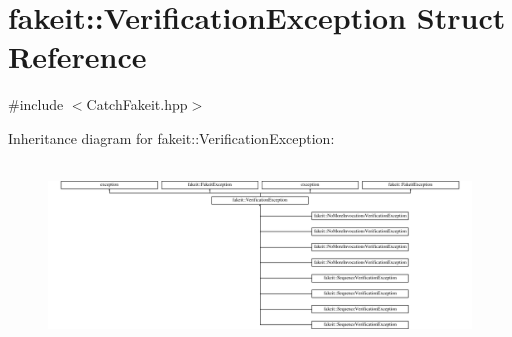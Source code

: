 \hypertarget{structfakeit_1_1VerificationException}{}\section{fakeit\+::Verification\+Exception Struct Reference}
\label{structfakeit_1_1VerificationException}


{\ttfamily \#include $<$Catch\+Fakeit.\+hpp$>$}

Inheritance diagram for fakeit\+::Verification\+Exception\+:\begin{figure}[H]
\begin{center}
\leavevmode
\includegraphics[height=4.895105cm]{structfakeit_1_1VerificationException}
\end{center}
\end{figure}
